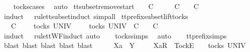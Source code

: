 \ \ \isamarkupfalse%
\ tocks{\isachardot}cases\ \isamarkupfalse%
\ auto%
\endisatagproof
{\isafoldproof}%
%
\isadelimproof
\isanewline
%
\endisadelimproof
\isanewline
{}\isamarkupfalse%
\ tt{\isacharunderscore}subset{\isacharunderscore}remove{\isacharunderscore}start{\isacharcolon}\ {\isachardoublequoteopen}{\isasymrho}{\isacharprime}\ {\isacharat}\ {\isasymsigma}{\isacharprime}\ {\isasymsubseteq}\isactrlsub C\ {\isasymrho}\ {\isacharat}\ {\isasymsigma}\ {\isasymLongrightarrow}\ {\isasymrho}{\isacharprime}\ {\isasymsubseteq}\isactrlsub C\ {\isasymrho}\ {\isasymLongrightarrow}\ {\isasymsigma}{\isacharprime}\ {\isasymsubseteq}\isactrlsub C\ {\isasymsigma}{\isachardoublequoteclose}\isanewline
%
\isadelimproof
\ \ %
\endisadelimproof
%
\isatagproof
{}\isamarkupfalse%
\ {\isacharparenleft}induct\ {\isasymrho}{\isacharprime}\ {\isasymrho}\ rule{\isacharcolon}tt{\isacharunderscore}subset{\isachardot}induct{\isacharcomma}\ simp{\isacharunderscore}all{\isacharparenright}%
\endisatagproof
{\isafoldproof}%
%
\isadelimproof
\isanewline
%
\endisadelimproof
\isanewline
{}\isamarkupfalse%
\ tt{\isacharunderscore}prefix{\isacharunderscore}subset{\isacharunderscore}lift{\isacharunderscore}tocks{\isacharcolon}\isanewline
\ \ {\isachardoublequoteopen}{\isasymrho}\ {\isasymlesssim}\isactrlsub C\ {\isasymsigma}\ {\isasymLongrightarrow}\ {\isasymrho}\ {\isasymin}\ tocks\ UNIV\ {\isasymLongrightarrow}\ {\isasymexists}\ {\isasymrho}{\isacharprime}\ {\isasymin}\ tocks\ UNIV{\isachardot}\ {\isasymrho}\ {\isasymlesssim}\isactrlsub C\ {\isasymrho}{\isacharprime}\ {\isasymand}\ {\isasymrho}{\isacharprime}\ {\isasymle}\isactrlsub C\ {\isasymsigma}{\isachardoublequoteclose}\isanewline
%
\isadelimproof
\ \ %
\endisadelimproof
%
\isatagproof
{}\isamarkupfalse%
\ {\isacharparenleft}induct\ {\isasymrho}\ {\isasymsigma}\ rule{\isacharcolon}ttWF{}{\isachardot}induct{\isacharcomma}\ auto{\isacharparenright}\isanewline
\ \ \isamarkupfalse%
\ tocks{\isachardot}simps\ \isamarkupfalse%
\ auto\isanewline
\ \ \isamarkupfalse%
\ tt{\isacharunderscore}prefix{\isachardot}simps\ \isamarkupfalse%
\ {\isacharparenleft}blast{\isacharcomma}\ blast{\isacharcomma}\ blast{\isacharcomma}\ blast{\isacharcomma}\ blast{\isacharparenright}\isanewline
{}\isamarkupfalse%
\ {\isacharminus}\isanewline
\ \ \isamarkupfalse%
\ Xa\ {\isasymrho}\ Y\ {\isasymsigma}\isanewline
\ \ \isamarkupfalse%
\ {\isachardoublequoteopen}{\isacharbrackleft}Xa{\isacharbrackright}\isactrlsub R\ {\isacharhash}\ {\isacharbrackleft}Tock{\isacharbrackright}\isactrlsub E\ {\isacharhash}\ {\isasymrho}\ {\isasymin}\ tocks\ UNIV{\isachardoublequoteclose}\isanewline
